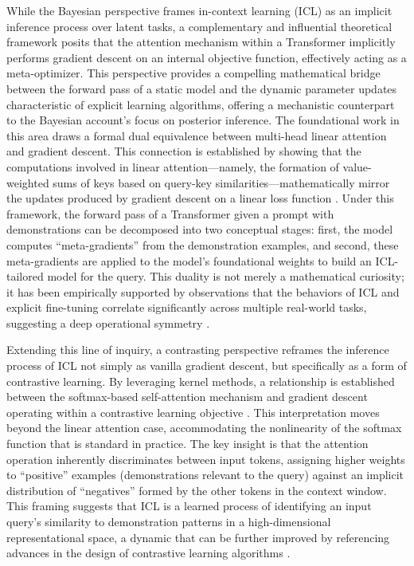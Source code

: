 \documentclass[11pt]{article}
\begin{document}
While the Bayesian perspective frames in-context learning (ICL) as an implicit inference process over latent tasks, a complementary and influential theoretical framework posits that the attention mechanism within a Transformer implicitly performs gradient descent on an internal objective function, effectively acting as a meta-optimizer. This perspective provides a compelling mathematical bridge between the forward pass of a static model and the dynamic parameter updates characteristic of explicit learning algorithms, offering a mechanistic counterpart to the Bayesian account's focus on posterior inference. The foundational work in this area draws a formal dual equivalence between multi-head linear attention and gradient descent. This connection is established by showing that the computations involved in linear attention---namely, the formation of value-weighted sums of keys based on query-key similarities---mathematically mirror the updates produced by gradient descent on a linear loss function \cite{ref25}. Under this framework, the forward pass of a Transformer given a prompt with demonstrations can be decomposed into two conceptual stages: first, the model computes ``meta-gradients'' from the demonstration examples, and second, these meta-gradients are applied to the model's foundational weights to build an ICL-tailored model for the query. This duality is not merely a mathematical curiosity; it has been empirically supported by observations that the behaviors of ICL and explicit fine-tuning correlate significantly across multiple real-world tasks, suggesting a deep operational symmetry \cite{ref25}.

Extending this line of inquiry, a contrasting perspective reframes the inference process of ICL not simply as vanilla gradient descent, but specifically as a form of contrastive learning. By leveraging kernel methods, a relationship is established between the softmax-based self-attention mechanism and gradient descent operating within a contrastive learning objective \cite{ref42}. This interpretation moves beyond the linear attention case, accommodating the nonlinearity of the softmax function that is standard in practice. The key insight is that the attention operation inherently discriminates between input tokens, assigning higher weights to ``positive'' examples (demonstrations relevant to the query) against an implicit distribution of ``negatives'' formed by the other tokens in the context window. This framing suggests that ICL is a learned process of identifying an input query's similarity to demonstration patterns in a high-dimensional representational space, a dynamic that can be further improved by referencing advances in the design of contrastive learning algorithms \cite{ref42}.
\end{document}
